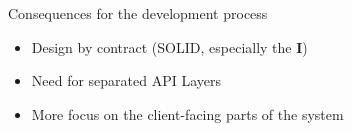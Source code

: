 \begin{frame}{Consequences for the development process}
    \begin{itemize}
        \item Design by contract (SOLID, especially the \textbf{I})
        \item Need for separated API Layers
        \item More focus on the client-facing parts of the system
    \end{itemize}

\end{frame}


